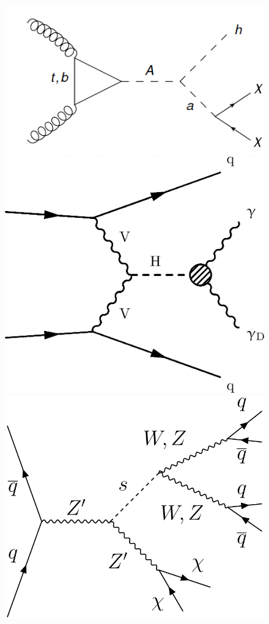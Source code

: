 \documentclass{moriond}
\begin{document}
\begin{figure} [htb]
\begin{minipage}{0.32\linewidth}
\centerline{\includegraphics[width=0.9\linewidth]{2HDM_a}}
\end{minipage}
\begin{minipage}{0.32\linewidth}
\centerline{\includegraphics[width=0.9\linewidth]{HiggsDarkPhotonDiagram}}
\end{minipage}
\begin{minipage}{0.32\linewidth}
\centerline{\includegraphics[width=0.9\linewidth]{MonoSVVDiagram}}

\end{minipage}
\end{figure}
\end{document}
